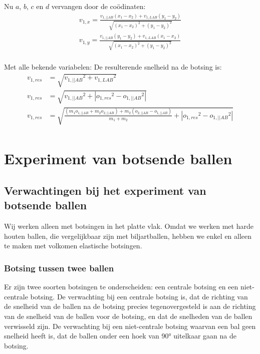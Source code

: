 \documentclass[12pt,a4paper]{article}
\begin{document}
	Nu $a$, $b$, $c$ en $d$ vervangen door de co\"{o}dinaten:
	\begin{equation}
		\begin{aligned}
			v_{1, x}=\frac{v_{1, ||AB}\left(x_1-x_2\right)+v_{1, LAB}\left(y_1-y_2\right)}{\sqrt{\left(x_1-x_2\right)^2+\left(y_1-y_2\right)^2}}\\
			v_{1, y}=\frac{v_{1, ||AB}\left(y_1-y_2\right)+v_{1, LAB}\left(x_1-x_2\right)}{\sqrt{\left(x_1-x_2\right)^2+\left(y_1-y_2\right)^2}}\\
		\end{aligned}
	\end{equation}
	
	Met alle bekende variabelen:
	De resulterende snelheid na de botsing is: 
	\begin{equation}
		\begin{aligned}
			v_{1, res}&=\sqrt{{v_{1, ||AB}}^2+{v_{1, LAB}}^2}\\
			v_{1, res}&=\sqrt{{v_{1, ||AB}}^2+|{o_{1, res}}^2-{o_{1, ||AB}}^2|}\\
			v_{1, res}&=\sqrt{\frac{\left(m_1o_{1, ||AB}+m_2o_{2, ||AB}\right)+m_2\left(o_{2, ||AB}-o_{1, ||AB}\right)}{m_1+m_2}+|{o_{1, res}}^2-{o_{1, ||AB}}^2|}\\
		\end{aligned}
	\end{equation}

	\newpage

	\section{Experiment van botsende ballen}

	\subsection{Verwachtingen bij het experiment van botsende ballen}
	Wij werken alleen met botsingen in het platte vlak. Omdat we werken met harde houten ballen, die vergelijkbaar zijn met biljartballen, hebben we enkel en alleen te maken met volkomen elastische botsingen.

	\subsubsection{Botsing tussen twee ballen}
	Er zijn twee soorten botsingen te onderscheiden: een centrale botsing en een niet-centrale botsing.
	De verwachting bij een centrale botsing is, dat de richting van de snelheid van de ballen na de botsing precies tegenovergesteld is aan de richting van de snelheid van de ballen voor de botsing, en dat de snelheden van de ballen verwisseld zijn.
	De verwachting bij een niet-centrale botsing waarvan een bal geen snelheid heeft is, dat de ballen onder een hoek van 90° uitelkaar gaan na de botsing. 
	
\end{document}
